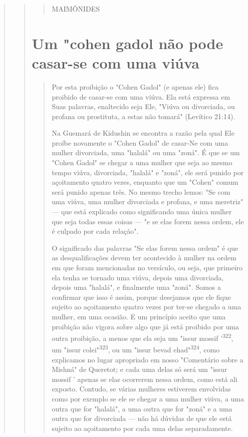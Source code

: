 \begin{quote}
\begin{quote}
\begin{quote}
MAIMÔNIDES
\end{quote}

\section{Um "cohen gadol não pode casar-se com uma viúva}

\begin{quote}
Por esta proibição o "Cohen Gadol" (e apenas ele) fica proibido de
ca­sar-se com uma viúva. Ela está expressa em Suas palavras, enaltecido
seja Ele, "Viúva ou divorciada, ou profana ou prostituta, a estas não
tomará" (Levítico 21:14).

Na Guemará de Kidushin se encontra a razão pela qual Ele proíbe
novamente o "Cohen Gadol" de casar-Ne com uma mulher divorciada, uma
"ha­lalá" ou uma "zoná". É que se um "Cohen Gadol" se chegar a uma
mulher que seja ao mesmo tempo viúva, divorciada, "halalá" e "zoná", ele
será puni­do por açoitamento quatro vezes, enquanto que um "Cohen" comum
será pu­nido apenas três. No mesmo trecho lemos: "Se com uma viúva, uma
mulher divorciada e profana, e uma meretriz" --- que está explicado como
significan­do uma única mulher que seja todas essas coisas --- "e se
elas forem nessa or­dem, ele é culpado por cada relação".

O significado das palavras "Se elas forem nessa ordem" é que as
des­qualificações devem ter acontecido à mulher na ordem em que foram
mencio­nadas no versículo, ou seja, que primeiro ela tenha se tornado
uma viúva, de­pois uma divorciada, depois uma "halalá", e finalmente uma
"zoná". Somos a confirmar que isso é assim, porque desejamos que ele
fique sujeito ao açoita­mento quatro vezes por ter-se chegado a uma
mulher, em uma ocasião. E um princípio aceito que uma proibição não
vigora sobre algo que já está proibido por uma outra proibição, a menos
que ela seja um "issur mossif '\textsuperscript{322}, um "is­sur
colei"\textsuperscript{323}, ou um "issur bevad
ehad"\textsuperscript{324}, como explicamos no lugar apro­priado em
nosso "Comentário sobre a Mishná" de Queretot; e cada uma delas só será
um "issur mossif ' apenas se elas ocorrerem nessa ordem, como está ali
exposto. Contudo, se várias mulheres estiverem envolvidas como por
exemplo se ele se chegar a uma mulher viúva, a uma outra que for
"halalá", a uma outra que for "zoná" e a uma outra que for divorciada
--- não há dúvidas de que ele está sujeito ao açoitamento por cada uma
delas separadamente.


\end{quote}
\end{quote}
\end{quote}
